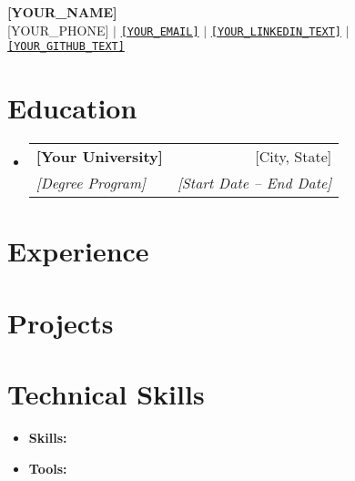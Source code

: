 \documentclass[letterpaper,11pt]{article}
\makeatletter
\newcommand{\resumeItem}[1]{
  \item\small{
    {#1 \vspace{-2pt}}
  }
}
\newcommand{\resumeSubheading}[4]{
  \vspace{-2pt}\item
    \begin{tabular*}{0.97\textwidth}[t]{l@{\extracolsep{\fill}}r}
      \textbf{#1} & #2 \\
      \textit{\small#3} & \textit{\small #4} \\
    \end{tabular*}\vspace{-7pt}
}
\newcommand{\resumeProjectHeading}[2]{
    \item
    \begin{tabular*}{0.97\textwidth}{l@{\extracolsep{\fill}}r}
      \small\textbf{#1} & #2 \\
    \end{tabular*}\vspace{-7pt}
}
\newcommand{\resumeSubHeadingListStart}{\begin{itemize}[leftmargin=0.15in, label={}]}
\newcommand{\resumeSubHeadingListEnd}{\end{itemize}}
\makeatother
\begin{document}
\begin{center}
    \textbf{\Huge \scshape [YOUR\_NAME]} \\ \vspace{1pt}
    \small [YOUR\_PHONE] $|$
    \href{mailto:[YOUR\_EMAIL]}{\nolinkurl{[YOUR\_EMAIL]}} $|$
    \href{[YOUR\_LINKEDIN\_URL]}{\nolinkurl{[YOUR\_LINKEDIN\_TEXT]}} $|$
    \href{[YOUR\_GITHUB\_URL]}{\nolinkurl{[YOUR\_GITHUB\_TEXT]}}
\end{center}


\section{Education}
  \resumeSubHeadingListStart
    \resumeSubheading
      {[Your University]}{[City, State]}
      {[Degree Program]}{[Start Date -- End Date]}
  \resumeSubHeadingListEnd


\section{Experience}
  \resumeSubHeadingListStart
  \resumeSubHeadingListEnd


\section{Projects}
    \resumeSubHeadingListStart
    \resumeSubHeadingListEnd


\section{Technical Skills}
 \begin{itemize}[leftmargin=0.15in, itemsep=1pt, topsep=2pt, parsep=0pt, label={}] %
    \item \small \textbf{Skills:} %
    \item \small \textbf{Tools:} %
 \end{itemize}


\end{document}

